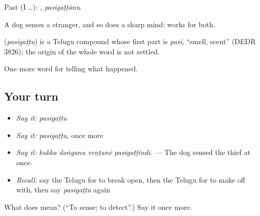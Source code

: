 Past (I …): , \emph{pasigaṭṭānu}.

A dog senses a stranger, and so does a sharp mind:  works for both.

\begin{cousinweb}
\textbf{} (\emph{pasigaṭṭu}) is a Telugu compound whose first part is \emph{pasi}, \textquotedblleft{}smell, scent\textquotedblright{} (DEDR 3826); the origin of the whole word is not settled.
\end{cousinweb}

\begin{grammarlens}[title={What you've built}]
One more word for telling what happened.
\end{grammarlens}

\subsection*{Your turn}
\begin{itemize}
\raggedright
  \item \emph{Say it:} \emph{pasigaṭṭu}
  \item \emph{Say it:} \emph{pasigaṭṭu}, once more
  \item \emph{Say it:} \emph{kukka doṅganu veṇṭanē pasigaṭṭindi.} — The dog sensed the thief at once.
  \item \emph{Recall:} say the Telugu for to break open, then the Telugu for to make off with, then say \emph{pasigaṭṭu} again
\end{itemize}

\begin{tcolorbox}[breakable,colback=teal!4,colframe=teal!35!black,title={Before you move on}]
What does  mean? (\textquotedblleft{}To sense; to detect\textquotedblright{}.) Say it once more.
\end{tcolorbox}
